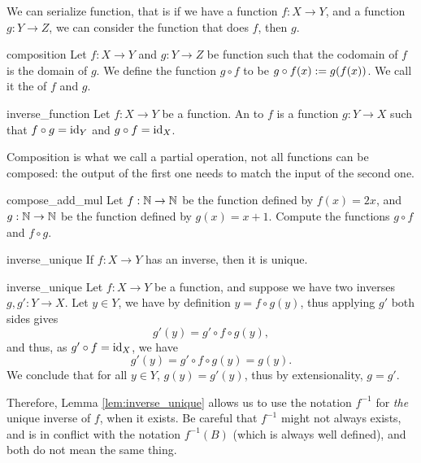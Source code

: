 We can serialize function, that is if we have a function \( f : X \to Y \), and a function \( g : Y \to Z \), we can consider the function that does \( f \), then \( g \). 

\begin{cdef}{}{composition}
    Let \( f : X \to Y \) and \( g : Y \to Z \) be function such that the codomain of \( f \) is the domain of \( g \). We define the function \( g \circ f \) to be \( g \circ f (x) := g(f(x)) \). We call it the  of \( f \) and \( g \).
\end{cdef}

\begin{cdef}{}{inverse_function}
    Let \( f : X \to Y \) be a function. An  to \( f \) is a function \( g : Y \to X \) such that \( f \circ g = \mathrm{id}_Y \) and \( g \circ f = \mathrm{id}_X \).
\end{cdef}

Composition is what we call a partial operation, not all functions can be composed: the output of the first one needs to match the input of the second one. 
\begin{cexp}{}{compose_add_mul}
    Let \( f : \mathbb{N} \to \mathbb{N} \) be the function defined by \( f(x) = 2x \), and \( g : \mathbb{N} \to \mathbb{N} \) be the function defined by \( g(x) = x + 1 \). Compute the functions \( g \circ f \) and \( f \circ g \).
\end{cexp} 

\begin{clem}{}{inverse_unique}
    If \( f : X \to Y \) has an inverse, then it is unique.      
\end{clem}
\begin{lemproof}{inverse_unique}
    Let \( f : X \to Y \) be a function, and suppose we have two inverses \( g, g' : Y \to X \). Let \( y \in Y \), we have by definition \( y = f\circ g(y) \), thus applying \( g' \) both sides gives
    \begin{equation*}
        g'(y) = g'\circ f\circ g(y),
    \end{equation*}
    and thus, as \( g'\circ f = \mathrm{id}_X \), we have
    \begin{equation*}
        g'(y) = g'\circ f\circ g(y) = g(y).
    \end{equation*}
    We conclude that for all \( y \in Y \), \( g(y) = g'(y) \), thus by extensionality, \( g = g' \).
\end{lemproof}

Therefore, Lemma \ref{lem:inverse_unique} allows us to use the notation \( f^{-1} \) for \textit{the} unique inverse of \( f \), when it exists. Be careful that \( f^{-1} \) might not always exists, and is in conflict with the notation \( f^{-1}(B) \) (which is always well defined), and both do not mean the same thing.

